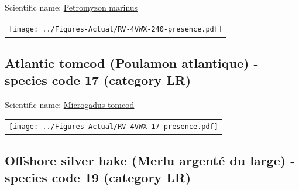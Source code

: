 \documentclass[12pt]{article}\usepackage[]{graphicx}\usepackage[]{color}
\begin{document}
  


Scientific name: \href{http://www.marinespecies.org/aphia.php?p=taxdetails\&id=101174}{Petromyzon marinus} \newline
\begin{minipage}{1.0\textwidth}
 \begin{tabular}{c}
\texttt{[image: ../Figures-Actual/RV-4VWX-240-presence.pdf]} \\ 
\end{tabular} 
\end{minipage}
\clearpage

\renewcommand\thefigure{\thesubsection\Alph{figure}}

\setcounter{figure}{0}

\hypertarget{sec:17}{%
\subsection{Atlantic tomcod (Poulamon atlantique) - species code 17 (category LR)}\label{sec:17}}

  


Scientific name: \href{http://www.marinespecies.org/aphia.php?p=taxdetails\&id=158928}{Microgadus tomcod} \newline
\begin{minipage}{1.0\textwidth}
 \begin{tabular}{c}
\texttt{[image: ../Figures-Actual/RV-4VWX-17-presence.pdf]} \\ 
\end{tabular} 
\end{minipage}
\clearpage

\renewcommand\thefigure{\thesubsection\Alph{figure}}

\setcounter{figure}{0}

\hypertarget{sec:19}{%
\subsection{Offshore silver hake (Merlu argenté du large) - species code 19 (category LR)}\label{sec:19}}

  
\end{document}
